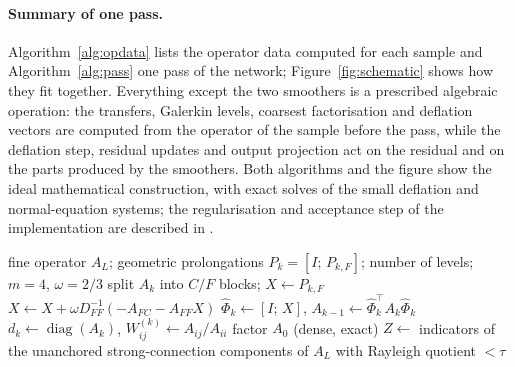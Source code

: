 \paragraph{Summary of one pass.} Algorithm~\ref{alg:opdata} lists the operator data computed for each sample and
Algorithm~\ref{alg:pass} one pass of the network; Figure~\ref{fig:schematic} shows how they fit together. Everything except
the two smoothers is a prescribed algebraic operation: the transfers, Galerkin levels, coarsest factorisation and deflation
vectors are computed from the operator of the sample before the pass, while the deflation step, residual updates and output
projection act on the residual and on the parts produced by the smoothers. Both algorithms and the figure show the ideal
mathematical construction, with exact solves of the small deflation and normal-equation systems; the regularisation and
acceptance step of the implementation are described in .
\begin{algorithm}[tbp]
\caption{Operator data for one sample (computed from $A = A_L$; no learned parameters).}\label{alg:opdata}
\begin{algorithmic}[1]
\Require fine operator $A_L$; geometric prolongations $P_k = [I;\,P_{k,F}]$; number of levels; $m = 4$, $\omega = 2/3$
  \State split $A_k$ into $C/F$ blocks; $X \gets P_{k,F}$
   \State $X \gets X + \omega D_{FF}^{-1}(-A_{FC} - A_{FF}X)$  \EndFor
  \State $\widehat\Phi_k \gets [I;\,X]$, \quad $A_{k-1} \gets \widehat\Phi_k^{\!\top}A_k\widehat\Phi_k$ 
  \State $d_k \gets \operatorname{diag}(A_k)$, \quad $W^{(k)}_{ij} \gets A_{ij}/A_{ii}$ 
\EndFor
\State factor $A_0$ (dense, exact)
\State $Z \gets$ indicators of the unanchored strong-connection components of $A_L$ with Rayleigh quotient $<\tau$ 
\end{algorithmic}
\end{algorithm}
